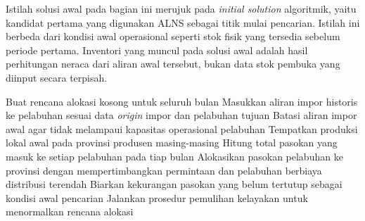 \documentclass{file/TA-ITS}
\theoremstyle{definition}
\theoremstyle{definition}
\theoremstyle{plain}
\begin{document}
Istilah solusi awal pada bagian ini merujuk pada \textit{initial solution} algoritmik, yaitu kandidat pertama yang digunakan ALNS sebagai titik mulai pencarian. Istilah ini berbeda dari kondisi awal operasional seperti stok fisik yang tersedia sebelum periode pertama. Inventori yang muncul pada solusi awal adalah hasil perhitungan neraca dari aliran awal tersebut, bukan data stok pembuka yang diinput secara terpisah.

\begin{algorithm}[H]\footnotesize
\caption{Konstruksi Solusi Awal Berbasis Data Historis}
\label{alg:initial_solution_concept}
Buat rencana alokasi kosong untuk seluruh bulan\;
Masukkan aliran impor historis ke pelabuhan sesuai data \textit{origin} impor dan pelabuhan tujuan\;
Batasi aliran impor awal agar tidak melampaui kapasitas operasional pelabuhan\;
Tempatkan produksi lokal awal pada provinsi produsen masing-masing\;
Hitung total pasokan yang masuk ke setiap pelabuhan pada tiap bulan\;
Alokasikan pasokan pelabuhan ke provinsi dengan mempertimbangkan permintaan dan pelabuhan berbiaya distribusi terendah\;
Biarkan kekurangan pasokan yang belum tertutup sebagai kondisi awal pencarian\;
Jalankan prosedur pemulihan kelayakan untuk menormalkan rencana alokasi\;
\end{algorithm}

\\
\end{document}
